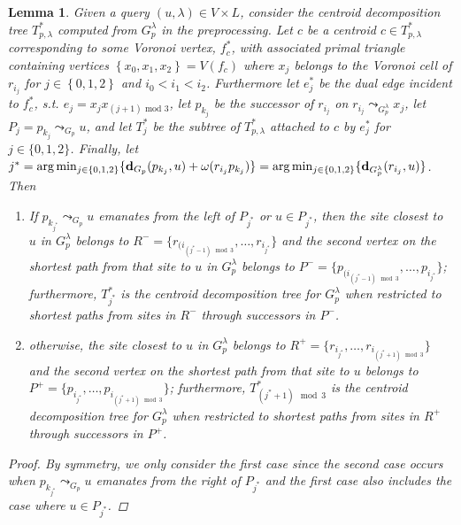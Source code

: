 \documentclass[a4paper,UKenglish,cleveref, autoref, thm-restate]{article}
\newtheorem{lemma}{Lemma}
\newcommand{\dist}[2]{\ensuremath{\normalfont{\textbf{d}}_{#1}({#2})}}
\begin{document}
\begin{lemma}\label{lem:point-location-inner}
Given a query $(u,\lambda) \in V\times L$, consider the centroid decomposition tree $T^*_{p,\lambda}$ computed from $G^\lambda_p$ in the preprocessing. Let $c$ be a centroid $c \in T^*_{p,\lambda}$ corresponding to some Voronoi vertex, $f_c^*$, with associated primal triangle containing vertices $\left\{ x_0,x_1,x_2 \right\} = V(f_c)$ where $x_j$ belongs to the Voronoi cell of $r_{i_j}$ for $j \in \left\{ 0,1,2 \right\}$ and $i_0 < i_1 < i_2$. Furthermore let $e^*_{j}$ be the dual edge incident to $f^*_c$, s.t. $e_{j} = x_{j}x_{(j+1) \text{ mod }3}$, let $p_{k_j}$ be the successor of $r_{i_j}$ on $r_{i_j} \leadsto_{G_p^\lambda} x_j$, let $P_j = p_{k_j} \leadsto_{G_p} u$, and let $T^*_j$ be the subtree of $T^*_{p,\lambda}$ attached to $c$ by $e^*_j$ for $j \in \{ 0,1,2 \}$. Finally, let $j^* = \arg\min_{j \in \{ 0,1,2 \}}\{ \dist{G_p}{p_{k_j},u} + \omega(r_{i_j}p_{k_j}) \} = \arg\min_{j \in \{ 0,1,2 \}}\{ \dist{G_p^\lambda}{r_{i_j},u} \}$. Then 
\begin{enumerate}
\item If $p_{k_{j^*}}\leadsto_{G_p} u$ emanates from the left of $P_{j^*}$ or $u\in P_{j^*}$, then the site closest to $u$ in $G_p^\lambda$ belongs to $R^- = \{r_{(i_{(j^*-1)\mod 3}},\ldots,r_{i_{j^*}}\}$ and the second vertex on the shortest path from that site to $u$ in $G_p^\lambda$ belongs to $P^- = \{p_{(i_{(j^*-1)\mod 3}},\ldots,p_{i_{j^*}}\}$; furthermore, $T^*_{j^*}$ is the centroid decomposition tree for $G_p^\lambda$ when restricted to shortest paths from sites in $R^-$ through successors in $P^-$. 
\item otherwise, the site closest to $u$ in $G_p^\lambda$ belongs to $R^+ = \{r_{i_{j^*}},\ldots,r_{i_{(j^*+1)\mod 3}}\}$ and the second vertex on the shortest path from that site to $u$ belongs to $P^+ = \{p_{i_{j^*}},\ldots,p_{i_{(j^*+1)\mod 3}}\}$;  furthermore, $T^*_{(j^*+1)\mod 3}$ is the centroid decomposition tree for $G_p^\lambda$ when restricted to shortest paths from sites in $R^+$ through successors in $P^+$. 
\end{enumerate}
\begin{proof}
By symmetry, we only consider the first case since the second case occurs when $p_{k_{j^*}}\leadsto_{G_p} u$ emanates from the right of $P_{j^*}$ and the first case also includes the case where $u\in P_{j^*}$.


\end{proof}
\end{lemma}
\end{document}
